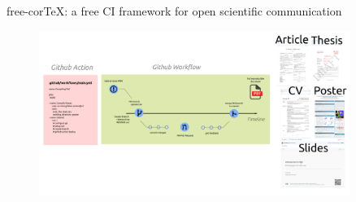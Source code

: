 {

\begin{frame}{
free-corTeX: a free CI framework for open scientific communication
}

      \begin{figure}
        \centering
        \includegraphics[width=0.9\textwidth]{./figs/free-cortex/versions/drawing-v00.png}
      \end{figure}

\end{frame}
}





